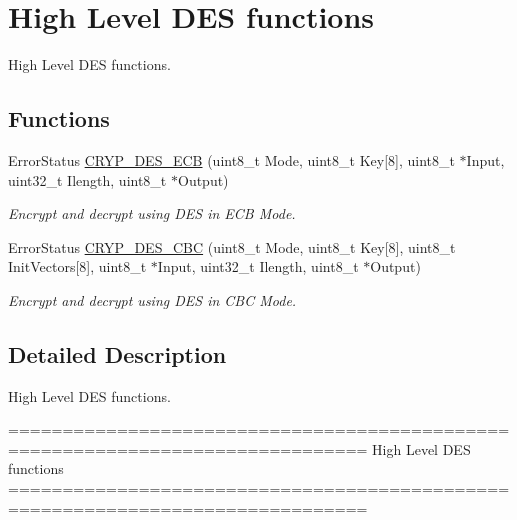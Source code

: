 \hypertarget{group___c_r_y_p___group8}{\section{High Level D\-E\-S functions}
\label{group___c_r_y_p___group8}
}


High Level D\-E\-S functions.  


\subsection*{Functions}
\begin{DoxyCompactItemize}
\item 
Error\-Status \hyperlink{group___c_r_y_p___group8_ga3b96b7608b39197209abed5f5845f590}{C\-R\-Y\-P\-\_\-\-D\-E\-S\-\_\-\-E\-C\-B} (uint8\-\_\-t Mode, uint8\-\_\-t Key\mbox{[}8\mbox{]}, uint8\-\_\-t $\ast$Input, uint32\-\_\-t Ilength, uint8\-\_\-t $\ast$Output)
\begin{DoxyCompactList}\small\item\em Encrypt and decrypt using D\-E\-S in E\-C\-B Mode. \end{DoxyCompactList}\item 
Error\-Status \hyperlink{group___c_r_y_p___group8_ga75724391a8560c557e1152b805f5cad1}{C\-R\-Y\-P\-\_\-\-D\-E\-S\-\_\-\-C\-B\-C} (uint8\-\_\-t Mode, uint8\-\_\-t Key\mbox{[}8\mbox{]}, uint8\-\_\-t Init\-Vectors\mbox{[}8\mbox{]}, uint8\-\_\-t $\ast$Input, uint32\-\_\-t Ilength, uint8\-\_\-t $\ast$Output)
\begin{DoxyCompactList}\small\item\em Encrypt and decrypt using D\-E\-S in C\-B\-C Mode. \end{DoxyCompactList}\end{DoxyCompactItemize}


\subsection{Detailed Description}
High Level D\-E\-S functions. \begin{DoxyVerb} ===============================================================================
                          High Level DES functions
 ===============================================================================
\end{DoxyVerb}
 

